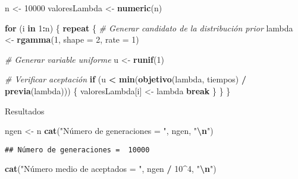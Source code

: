 \documentclass[
]{article}
\newenvironment{Shaded}{\begin{snugshade}}{\end{snugshade}}
\newcommand{\AttributeTok}[1]{\textcolor[rgb]{0.13,0.29,0.53}{#1}}
\newcommand{\CommentTok}[1]{\textcolor[rgb]{0.56,0.35,0.01}{\textit{#1}}}
\newcommand{\ControlFlowTok}[1]{\textcolor[rgb]{0.13,0.29,0.53}{\textbf{#1}}}
\newcommand{\DecValTok}[1]{\textcolor[rgb]{0.00,0.00,0.81}{#1}}
\newcommand{\FunctionTok}[1]{\textcolor[rgb]{0.13,0.29,0.53}{\textbf{#1}}}
\newcommand{\NormalTok}[1]{#1}
\newcommand{\OtherTok}[1]{\textcolor[rgb]{0.56,0.35,0.01}{#1}}
\newcommand{\SpecialCharTok}[1]{\textcolor[rgb]{0.81,0.36,0.00}{\textbf{#1}}}
\newcommand{\StringTok}[1]{\textcolor[rgb]{0.31,0.60,0.02}{#1}}
\begin{document}
\begin{Shaded}
\begin{Highlighting}[]
\NormalTok{n }\OtherTok{\textless{}{-}} \DecValTok{10000}
\NormalTok{valoresLambda }\OtherTok{\textless{}{-}} \FunctionTok{numeric}\NormalTok{(n)}

\ControlFlowTok{for}\NormalTok{ (i }\ControlFlowTok{in} \DecValTok{1}\SpecialCharTok{:}\NormalTok{n) \{}
  \ControlFlowTok{repeat}\NormalTok{ \{}
    \CommentTok{\# Generar candidato de la distribución prior}
\NormalTok{    lambda }\OtherTok{\textless{}{-}} \FunctionTok{rgamma}\NormalTok{(}\DecValTok{1}\NormalTok{, }\AttributeTok{shape =} \DecValTok{2}\NormalTok{, }\AttributeTok{rate =} \DecValTok{1}\NormalTok{)}
    
    \CommentTok{\# Generar variable uniforme}
\NormalTok{    u }\OtherTok{\textless{}{-}} \FunctionTok{runif}\NormalTok{(}\DecValTok{1}\NormalTok{)}
    
    \CommentTok{\# Verificar aceptación}
    \ControlFlowTok{if}\NormalTok{ (u }\SpecialCharTok{\textless{}} \FunctionTok{min}\NormalTok{(}\FunctionTok{objetivo}\NormalTok{(lambda, tiempos) }\SpecialCharTok{/} \FunctionTok{previa}\NormalTok{(lambda))) \{}
\NormalTok{      valoresLambda[i] }\OtherTok{\textless{}{-}}\NormalTok{ lambda}
      \ControlFlowTok{break}
\NormalTok{    \}}
\NormalTok{  \}}
\NormalTok{\}}
\end{Highlighting}
\end{Shaded}

Resultados

\begin{Shaded}
\begin{Highlighting}[]
\NormalTok{ngen }\OtherTok{\textless{}{-}}\NormalTok{ n  }
\FunctionTok{cat}\NormalTok{(}\StringTok{"Número de generaciones = "}\NormalTok{, ngen, }\StringTok{"}\SpecialCharTok{\textbackslash{}n}\StringTok{"}\NormalTok{)}
\end{Highlighting}
\end{Shaded}

\begin{verbatim}
## Número de generaciones =  10000
\end{verbatim}

\begin{Shaded}
\begin{Highlighting}[]
\FunctionTok{cat}\NormalTok{(}\StringTok{"Número medio de aceptados = "}\NormalTok{, ngen }\SpecialCharTok{/} \DecValTok{10}\SpecialCharTok{\^{}}\DecValTok{4}\NormalTok{, }\StringTok{"}\SpecialCharTok{\textbackslash{}n}\StringTok{"}\NormalTok{)}
\end{Highlighting}
\end{Shaded}
\end{document}
